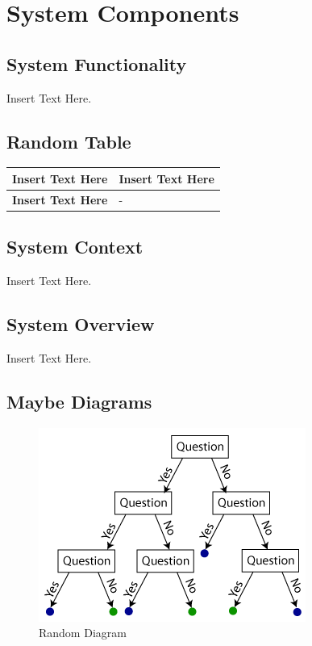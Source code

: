 \documentclass [11pt]{article}
\begin{document}


\section{System Components}
\subsection{System Functionality}
Insert Text Here. 

\subsection{Random Table}

\begin{longtable}{| p{ } | p{ } | }\hline 
\textbf{Insert Text Here} & \textbf{Insert Text Here} \\ \hline
\textbf{Insert Text Here} & -\\ \hline 
\end{longtable}


\subsection{System Context}
Insert Text Here. 

\subsection{System Overview}
Insert Text Here. 

\subsection{Maybe Diagrams}
\begin{figure} [h!]
	\centering
	\includegraphics [scale = 1] {figures/random_diagram.png}
	\caption{Random Diagram}
\end{figure}
\end{document}
